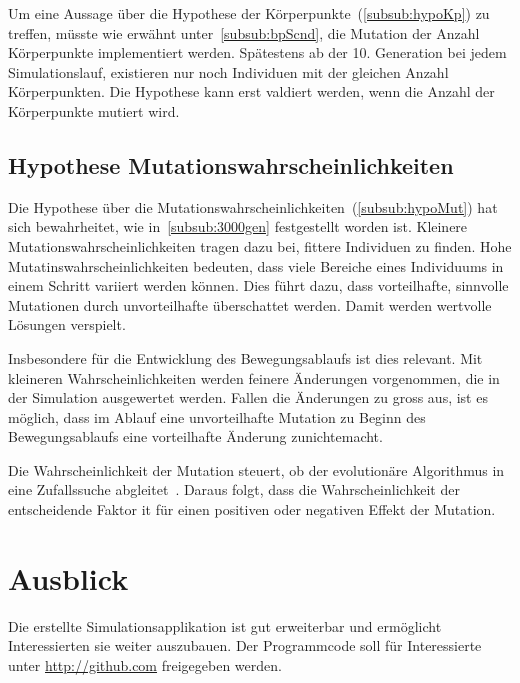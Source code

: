       Um eine Aussage über die Hypothese der Körperpunkte~(\vref{subsub:hypoKp}) zu treffen,
      müsste wie erwähnt unter~\vref{subsub:bpScnd}, die Mutation der Anzahl Körperpunkte implementiert werden.
      Spätestens ab der 10. Generation bei jedem Simulationslauf,
      existieren nur noch Individuen mit der gleichen Anzahl Körperpunkten.
      Die Hypothese kann erst valdiert werden, wenn die Anzahl der Körperpunkte mutiert wird.

    \subsection{Hypothese Mutationswahrscheinlichkeiten}

      Die Hypothese über die Mutationswahrscheinlichkeiten~(\vref{subsub:hypoMut}) hat sich bewahrheitet,
      wie in~\vref{subsub:3000gen} festgestellt worden ist.
      Kleinere Mutationswahrscheinlichkeiten tragen dazu bei, fittere Individuen zu finden.
      Hohe Mutatinswahrscheinlichkeiten bedeuten,
      dass viele Bereiche eines Individuums in einem Schritt variiert werden können.
      Dies führt dazu, dass vorteilhafte, sinnvolle Mutationen durch unvorteilhafte überschattet werden.
      Damit werden wertvolle Lösungen verspielt.

      \smallskip

      Insbesondere für die Entwicklung des Bewegungsablaufs ist dies relevant.
      Mit kleineren Wahrscheinlichkeiten werden feinere Änderungen vorgenommen,
      die in der Simulation ausgewertet werden.
      Fallen die Änderungen zu gross aus, ist es möglich, dass im Ablauf eine unvorteilhafte Mutation
      zu Beginn des Bewegungsablaufs eine vorteilhafte Änderung zunichtemacht.

      \smallskip

      Die Wahrscheinlichkeit der Mutation steuert,
      ob der evolutionäre Algorithmus in eine Zufallssuche abgleitet~\cite{Sampson1976}.
      Daraus folgt, dass die Wahrscheinlichkeit der entscheidende Faktor it für einen positiven oder
      negativen Effekt der Mutation.

  \section{Ausblick\label{sec:ausblick}}

    Die erstellte Simulationsapplikation ist gut erweiterbar und ermöglicht Interessierten sie weiter auszubauen.
    Der Programmcode soll für Interessierte unter \url{http://github.com} freigegeben werden.

